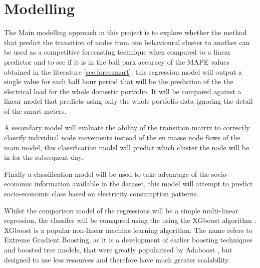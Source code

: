 \section{Modelling}
The Main modelling approach in this project is to explore whether the method that predict the transition of nodes from one behavioural cluster to another can be used as a competitive forecasting technique when compared to a linear predictor and to see if it is in the ball park accuracy of the MAPE values obtained in the literature \ref{sec:forcesmart}, this regression model will output a single value for each half hour period that will be the prediction of the the electrical load for the whole domestic portfolio. It will be compared against a linear model that predicts using only the whole portfolio data ignoring the detail of the smart meters.

A secondary model will evaluate the ability of the transition matrix to correctly classify individual node movements instead of the en masse node flows of the main model, this classification model will predict which cluster the node will be in for the subsequent day.

Finally a classification model will be used to take advantage of the socio-economic information available in the dataset, this model will attempt to predict socio-economic class based on electricity consumption patterns.

Whilst the comparison model of the regressions will be a simple multi-linear regression, the classifer will be comapred using the using the XGboost algorithm \cite{chen2016}. XGboost is a popular non-linear machine learning algorithm. The name refers to Extreme Gradient Boosting, as it is a development of earlier boosting techniques \cite{schapire2003} and boosted tree models, that were greatly popularised by Adaboost  \cite{freund1997}, but designed to use less resources and therefore have much greater scalability.

